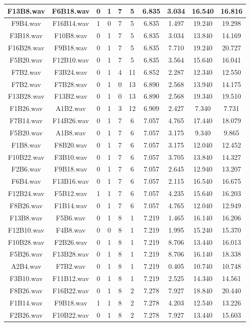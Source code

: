 \documentclass[11pt,a4paper]{book}
\begin{document}
\begin{longtable}[c]{|c|c|c|c|c|c|c|c|c|c|}
F13B8.wav&F6B18.wav&0&1&7&5&6.835&3.034&16.540&16.816\\ \hline
F9B4.wav&F16B14.wav&1&0&7&5&6.835&1.497&19.240&19.298\\ \hline
F3B18.wav&F10B8.wav&0&1&7&5&6.835&3.034&13.840&14.169\\ \hline
F16B28.wav&F9B18.wav&0&1&7&5&6.835&7.710&19.240&20.727\\ \hline
F5B20.wav&F12B10.wav&0&1&7&5&6.835&3.564&15.640&16.041\\ \hline
F7B2.wav&F3B24.wav&0&1&4&11&6.852&2.287&12.340&12.550\\ \hline
F7B2.wav&F7B28.wav&0&1&0&13&6.890&2.568&13.940&14.175\\ \hline
F13B28.wav&F13B2.wav&0&1&0&13&6.890&2.568&19.340&19.510\\ \hline
F1B26.wav&A1B2.wav&0&1&3&12&6.909&2.427&7.340&7.731\\ \hline
F7B14.wav&F14B26.wav&0&1&7&6&7.057&4.765&17.440&18.079\\ \hline
F5B20.wav&A1B8.wav&0&1&7&6&7.057&3.175&9.340&9.865\\ \hline
F1B8.wav&F8B20.wav&0&1&7&6&7.057&3.175&12.040&12.452\\ \hline
F10B22.wav&F3B10.wav&0&1&7&6&7.057&3.705&13.840&14.327\\ \hline
F2B6.wav&F9B18.wav&0&1&7&6&7.057&2.645&12.940&13.207\\ \hline
F6B4.wav&F13B16.wav&0&1&7&6&7.057&2.115&16.540&16.675\\ \hline
F12B24.wav&F5B12.wav&1&1&7&6&7.057&4.235&15.640&16.203\\ \hline
F8B26.wav&F1B14.wav&0&1&7&6&7.057&4.765&12.040&12.949\\ \hline
F13B8.wav&F5B6.wav&0&1&8&1&7.219&1.465&16.140&16.206\\ \hline
F12B10.wav&F4B8.wav&0&0&8&1&7.219&1.995&15.240&15.370\\ \hline
F10B28.wav&F2B26.wav&0&1&8&1&7.219&8.706&13.440&16.013\\ \hline
F5B26.wav&F13B28.wav&0&1&8&1&7.219&8.706&16.140&18.338\\ \hline
A2B4.wav&F7B2.wav&0&1&8&1&7.219&0.405&10.740&10.748\\ \hline
F3B10.wav&F11B12.wav&0&1&8&1&7.219&2.525&14.340&14.561\\ \hline
F8B26.wav&F16B22.wav&0&1&8&2&7.278&7.927&18.840&20.440\\ \hline
F1B14.wav&F9B18.wav&1&1&8&2&7.278&4.203&12.540&13.226\\ \hline
F2B26.wav&F10B22.wav&0&1&8&2&7.278&7.927&13.440&15.603\\ \hline

\end{longtable}
\end{document}

